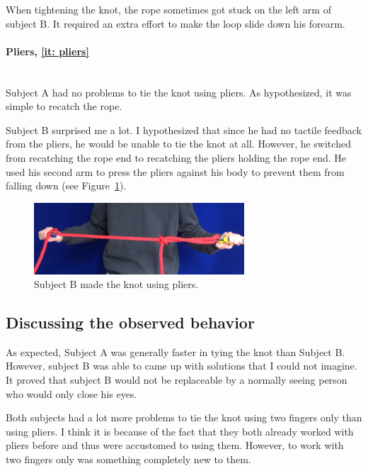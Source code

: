                 When tightening the knot, the rope sometimes got stuck on the left arm of subject B. It required an extra effort to make the loop slide down his forearm.

            \paragraph{Pliers, \ref{it: pliers}}~\\
                \indent Subject A had no problems to tie the knot using pliers. As hypothesized, it was simple to recatch the rope.

                Subject B surprised me a lot. I hypothesized that since he had no tactile feedback from the pliers, he would be unable to tie the knot at all. However, he switched from recatching the rope end to recatching the pliers holding the rope end. He used his second arm to press the pliers against his body to prevent them from falling down (see Figure~\ref{fig:BPliers}).

                \begin{figure}[h]
                \includegraphics[width=0.7\textwidth]{BPliers.png}
                \centering
                \caption{Subject B made the knot using pliers.}
                \label{fig:BPliers}
                \end{figure}


        \subsection{Discussing the observed behavior}
            As expected, Subject A was generally faster in tying the knot than Subject B. However, subject B was able to came up with solutions that I could not imagine. It proved that subject B would not be replaceable by a normally seeing person who would only close his eyes.

            Both subjects had a lot more problems to tie the knot using two fingers only than using pliers. I think it is because of the fact that they both already worked with pliers before and thus were accustomed to using them. However, to work with two fingers only was something completely new to them.

